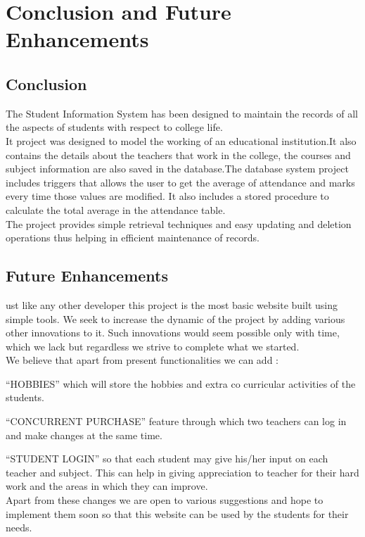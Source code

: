 \chapter{Conclusion and Future Enhancements}

\section{Conclusion}
The Student Information System has been designed to maintain the records of all the aspects of students with respect to college life.\\[0.1in] 

It project was designed  to model the working of an educational institution.It also contains the details about the teachers that work in the college, the courses and subject information are also saved in the database.The database system project includes triggers that allows the user to get the average of attendance and marks  every time those values are modified. It also includes a stored procedure to calculate the total average in the attendance table.\\[0.1in]

The project provides simple retrieval techniques and easy updating and deletion operations thus helping in efficient maintenance of records.

\pagebreak

\section{Future Enhancements}
ust like any other developer this project is the most basic website built using simple tools. We seek to increase the dynamic of the project by adding various other innovations to it. Such innovations would seem possible only with time, which we lack but regardless we strive to complete what we started.\\[0.1in]

We believe that apart from present functionalities we can add :

“HOBBIES” which will store the hobbies and extra co curricular activities of the students.

“CONCURRENT PURCHASE” feature through which two teachers can log in and make changes at the same time.


“STUDENT LOGIN” so that each student may give his/her input on each teacher and subject. This can help in giving appreciation to teacher for their hard  work and the areas in which they can improve.\\[0.1in]


Apart from these changes we are open to various suggestions and hope to implement them soon so that this website can be used by the students for their needs.




